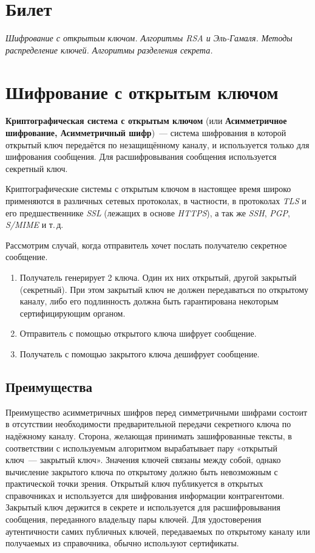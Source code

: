 \documentclass[a4paper,10pt]{article}
\begin{document}
\section*{Билет }
{\em Шифрование с открытым ключом. Алгоритмы RSA и Эль-Гамаля.
Методы распределение ключей. Алгоритмы разделения секрета.}

\section{Шифрование с открытым ключом} 
{\bf Криптографическая система с открытым ключом} (или {\bf Асимметричное шифрование, Асимметричный шифр})~--- система шифрования 
в которой открытый ключ передаётся по незащищённому каналу, и
используется только для шифрования сообщения. Для расшифровывания сообщения используется секретный ключ.

Криптографические системы с открытым ключом в настоящее время широко применяются в различных сетевых протоколах, в частности, в протоколах
{\it TLS\/} и его предшественнике {\it SSL} (лежащих в основе {\it HTTPS}), а так же {\it SSH}, {\it PGP}, {\it S/MIME} и т.\,д.

Рассмотрим случай, когда отправитель хочет послать получателю секретное сообщение.
\begin{enumerate}
   \item Получатель генерирует 2 ключа. Один их них открытый, другой закрытый (секретный). При этом закрытый ключ не должен передаваться по
      открытому каналу, либо его подлинность должна быть гарантирована некоторым сертифицирующим органом.

   \item Отправитель с помощью открытого ключа шифрует сообщение.
 
   \item Получатель с помощью закрытого ключа дешифрует сообщение.

\end{enumerate}

\subsection{Преимущества}
Преимущество асимметричных шифров перед симметричными шифрами состоит в отсутствии необходимости предварительной передачи секретного ключа
по надёжному каналу. Сторона, желающая принимать зашифрованные тексты, в соответствии с используемым алгоритмом вырабатывает пару «открытый
ключ~--- закрытый ключ». Значения ключей связаны между собой, однако вычисление закрытого ключа по открытому должно быть невозможным с
практической точки зрения. Открытый ключ публикуется в открытых справочниках и используется для шифрования информации контрагентоми.
Закрытый ключ держится в секрете и используется для расшифровывания сообщения, переданного владельцу пары ключей.
Для удостоверения аутентичности самих публичных ключей, передаваемых по открытому каналу или получаемых из справочника, обычно
используют сертификаты.
\end{document}
